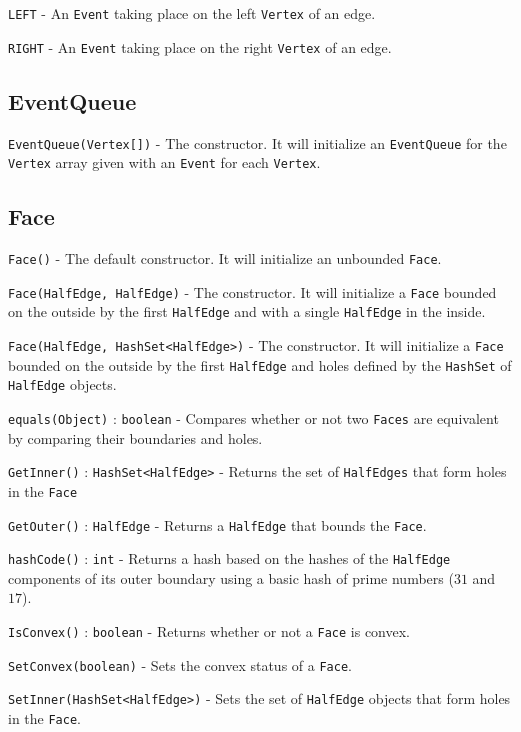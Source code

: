 \documentclass[11pt]{article}
\begin{document}
	\texttt{LEFT} - An \texttt{Event} taking place on the left \texttt{Vertex} of an edge.
	
	\texttt{RIGHT} - An \texttt{Event} taking place on the right \texttt{Vertex} of an edge.

\subsection{EventQueue}
\label{sec:eventqueue}

	\texttt{EventQueue(Vertex[])} - The constructor. It will initialize an \texttt{EventQueue} for the \texttt{Vertex} array given with an \texttt{Event} for each \texttt{Vertex}.

\subsection{Face}
\label{sec:face}

	\texttt{Face()} - The default constructor. It will initialize an unbounded \texttt{Face}.
	
	\texttt{Face(HalfEdge, HalfEdge)} - The constructor. It will initialize a \texttt{Face} bounded on the outside by the first \texttt{HalfEdge} and with a single \texttt{HalfEdge} in the inside.
	
	\texttt{Face(HalfEdge, HashSet<HalfEdge>)} - The constructor. It will initialize a \texttt{Face} bounded on the outside by the first \texttt{HalfEdge} and holes defined by the \texttt{HashSet} of \texttt{HalfEdge} objects.
	
	\texttt{equals(Object)} : \texttt{boolean} - Compares whether or not two \texttt{Faces} are equivalent by comparing their boundaries and holes.
	
	\texttt{GetInner()} : \texttt{HashSet<HalfEdge>} - Returns the set of \texttt{HalfEdges} that form holes in the \texttt{Face}
	
	\texttt{GetOuter()} : \texttt{HalfEdge} - Returns a \texttt{HalfEdge} that bounds the \texttt{Face}.
	
	\texttt{hashCode()} : \texttt{int} - Returns a hash based on the hashes of the \texttt{HalfEdge} components of its outer boundary using a basic hash of prime numbers ($31$ and $17$).
	
	\texttt{IsConvex()} : \texttt{boolean} - Returns whether or not a \texttt{Face} is convex.
	
	\texttt{SetConvex(boolean)} - Sets the convex status of a \texttt{Face}.
	
	\texttt{SetInner(HashSet<HalfEdge>)} - Sets the set of \texttt{HalfEdge} objects that form holes in the \texttt{Face}.
	
\end{document}
